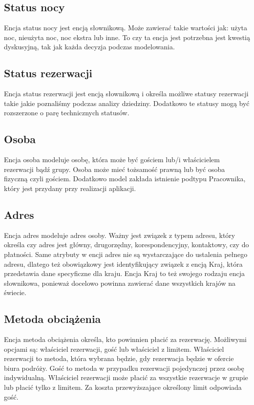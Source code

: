 \documentclass[a4paper,onecolumn,oneside,11pt,wide,floatssmall]{mwrep}
\theoremstyle{definition}
\theoremstyle{plain}%
\theoremstyle{remark}
\begin{document}
\subsection{Status nocy}
Encja status nocy jest encją słownikową. Może zawierać takie wartości jak: użyta noc, nieużyta noc, noc ekstra lub inne. To czy ta encja jest potrzebna jest kwestią dyskusyjną, tak jak każda decyzja podczas modelowania.

\subsection{Status rezerwacji}
Encja status rezerwacji jest encją słownikową i określa możliwe statusy rezerwacji takie jakie poznaliśmy podczas analizy dziedziny. Dodatkowo te statusy mogą być rozszerzone o parę technicznych statusów.

\subsection{Osoba}
Encja osoba modeluje osobę, która może być gościem lub/i właścicielem rezerwacji bądź grupy. Osoba może mieć tożsamość prawną lub być osoba fizyczną czyli gościem. Dodatkowo model zakłada istnienie podtypu Pracownika, który jest przydany przy realizacji aplikacji. 

\subsection{Adres}
Encja adres modeluje adres osoby. Ważny jest związek z typem adresu, który określa czy adres jest główny, drugorzędny, korespondencyjny, kontaktowy, czy do płatności. Same atrybuty w encji adres nie są wystarczające do ustalenia pełnego adresu, dlatego też obowiązkowy jest identyfikujący związek z encją Kraj, która przedstawia dane specyficzne dla kraju. Encja Kraj to też swojego rodzaju encja słownikowa, ponieważ docelowo powinna zawierać dane wszystkich krajów na świecie.

\subsection{Metoda obciążenia}
Encja metoda obciążenia określa, kto powinnien płacić za rezerwację. Możliwymi opcjami są: właściciel rezerwacji, gość lub właściciel z limitem. Właściciel rezerwacji to metoda, która wybrana będzie, gdy rezerwacja będzie w ofercie biura podróży. Gość to metoda w przypadku rezerwacji pojedynczej przez osobę indywidualną. Właściciel rezerwacji może płacić za wszystkie rezerwacje w grupie lub płacić tylko z limitem. Za koszta przewyższające określony limit odpowiada gość. 
\end{document}
